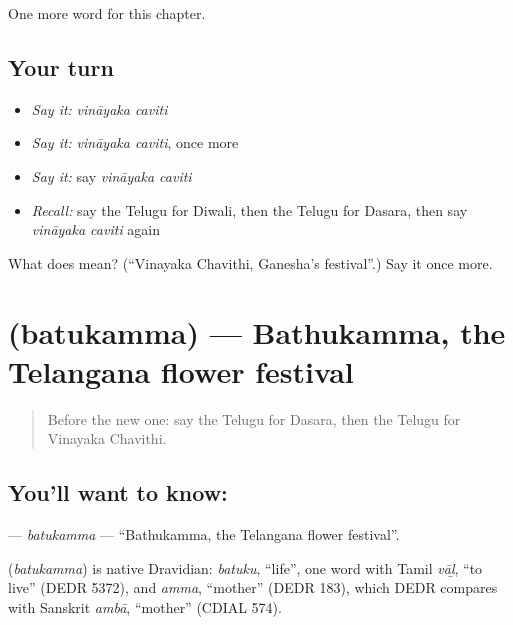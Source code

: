 \begin{grammarlens}[title={What you've built}]
One more word for this chapter.
\end{grammarlens}

\subsection*{Your turn}
\begin{itemize}
\raggedright
  \item \emph{Say it:} \emph{vināyaka caviti}
  \item \emph{Say it:} \emph{vināyaka caviti}, once more
  \item \emph{Say it:} say \emph{vināyaka caviti}
  \item \emph{Recall:} say the Telugu for Diwali, then the Telugu for Dasara, then say \emph{vināyaka caviti} again
\end{itemize}

\begin{tcolorbox}[breakable,colback=teal!4,colframe=teal!35!black,title={Before you move on}]
What does   mean? (\textquotedblleft{}Vinayaka Chavithi, Ganesha's festival\textquotedblright{}.) Say it once more.
\end{tcolorbox}
\section[\texorpdfstring{\te{బతుకమ్మ} (batukamma)}{బతుకమ్మ (batukamma)}]{ (batukamma) — Bathukamma, the Telangana flower festival}

\label{lesson:TE-C252-batukamma}



\begin{quote}
Before the new one: say the Telugu for Dasara, then the Telugu for Vinayaka Chavithi.
\end{quote}

\subsection*{You'll want to know: }
\textbf{} — \emph{batukamma} — \textquotedblleft{}Bathukamma, the Telangana flower festival\textquotedblright{}.

\begin{cousinweb}
\textbf{} (\emph{batukamma}) is native Dravidian: \emph{batuku}, \textquotedblleft{}life\textquotedblright{}, one word with Tamil \emph{vāḻ}, \textquotedblleft{}to live\textquotedblright{} (DEDR 5372), and \emph{amma}, \textquotedblleft{}mother\textquotedblright{} (DEDR 183), which DEDR compares with Sanskrit \emph{ambā}, \textquotedblleft{}mother\textquotedblright{} (CDIAL 574).
\end{cousinweb}


